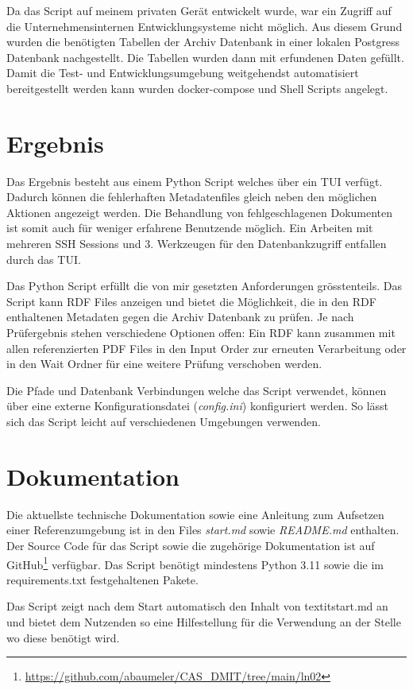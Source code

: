 \documentclass[a4paper,oneside, 12pt]{report}
\begin{document}
Da das Script auf meinem privaten Gerät entwickelt wurde, war ein Zugriff auf die Unternehmensinternen Entwicklungsysteme nicht möglich. Aus diesem Grund wurden die benötigten Tabellen der Archiv Datenbank in einer lokalen Postgress Datenbank nachgestellt. Die Tabellen wurden dann mit erfundenen Daten gefüllt. Damit die Test- und Entwicklungsumgebung weitgehendst automatisiert bereitgestellt werden kann wurden docker-compose und Shell Scripts angelegt.


\section{Ergebnis}
Das Ergebnis besteht aus einem Python Script welches über ein \ac{TUI} verfügt. Dadurch können die fehlerhaften Metadatenfiles gleich neben den möglichen Aktionen angezeigt werden. Die Behandlung von fehlgeschlagenen Dokumenten ist somit auch für weniger erfahrene Benutzende möglich. Ein Arbeiten mit mehreren SSH Sessions und 3. Werkzeugen für den Datenbankzugriff entfallen durch das \ac{TUI}.

Das Python Script erfüllt die von mir gesetzten Anforderungen grösstenteils. Das Script kann RDF Files anzeigen und bietet die Möglichkeit, die in den RDF enthaltenen Metadaten gegen die Archiv Datenbank zu prüfen. Je nach Prüfergebnis stehen verschiedene Optionen offen: Ein RDF kann zusammen mit allen referenzierten PDF Files in den Input Order zur erneuten Verarbeitung oder in den Wait Ordner für eine weitere Prüfung verschoben werden.

Die Pfade und Datenbank Verbindungen welche das Script verwendet, können über eine externe Konfigurationsdatei (\textit{config.ini}) konfiguriert werden. So lässt sich das Script leicht auf verschiedenen Umgebungen verwenden.
 
\section{Dokumentation}
Die aktuellste technische Dokumentation sowie eine Anleitung zum Aufsetzen einer Referenzumgebung ist in den Files \textit{start.md} sowie \textit{README.md} enthalten. Der Source Code für das Script sowie die zugehörige Dokumentation ist auf GitHub\footnote{\url{https://github.com/abaumeler/CAS_DMIT/tree/main/ln02}} verfügbar. Das Script benötigt mindestens Python 3.11 sowie die im requirements.txt festgehaltenen Pakete. 

Das Script zeigt nach dem Start automatisch den Inhalt von textit{start.md} an und bietet dem Nutzenden so eine Hilfestellung für die Verwendung an der Stelle wo diese benötigt wird.
\end{document}
